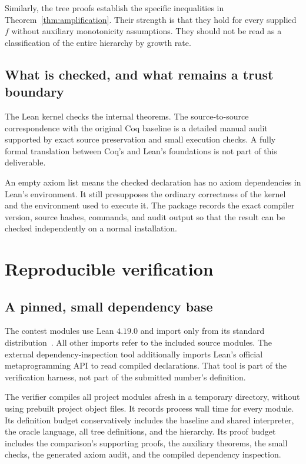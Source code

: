Similarly, the tree proofs establish the specific inequalities in
Theorem~\ref{thm:amplification}. Their strength is that they hold for
every supplied \(f\) without auxiliary monotonicity assumptions.
They should not be read as a classification of the entire hierarchy
by growth rate.

\subsection{What is checked, and what remains a trust boundary}
The Lean kernel checks the internal theorems. The source-to-source
correspondence with the original Coq baseline is a detailed manual
audit supported by exact source preservation and small execution
checks. A fully formal translation between Coq's and Lean's
foundations is not part of this deliverable.

An empty axiom list means the checked declaration has no
axiom dependencies in Lean's environment. It still presupposes
the ordinary correctness of the kernel and the environment used
to execute it. The package records the exact compiler version,
source hashes, commands, and audit output so that the result can
be checked independently on a normal installation.

\section{Reproducible verification}\label{sec:verification}
\subsection{A pinned, small dependency base}
The contest modules use Lean \(4.19.0\) and import only 
from its standard distribution~\cite{lean-release}. All other
imports refer to the included source modules. The external
dependency-inspection tool additionally imports Lean's official
metaprogramming API to read compiled declarations. That tool is
part of the verification harness, not part of the submitted
number's definition.

The verifier compiles all project modules afresh in a temporary
directory, without using prebuilt project object files.
It records process wall time for every module. Its definition
budget conservatively includes the baseline and shared interpreter,
the oracle language, all tree definitions, and the hierarchy.
Its proof budget includes the comparison's supporting proofs,
the auxiliary theorems, the small checks, the generated axiom
audit, and the compiled dependency inspection.


